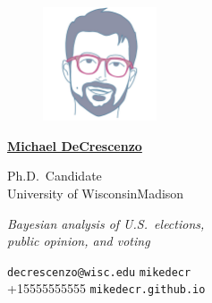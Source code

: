 \documentclass[10pt, oneside, final]{article}
\begin{document}
  \thispagestyle{empty}
  
  \begin{figure}
  \includegraphics[width = 0.3\textwidth]{img/circular-telles.png}
  \end{figure}

  \underline{\large\textsf{\textbf{Michael DeCrescenzo}}}

  {Ph.D.\ Candidate} \\
  {University of Wisconsin{\textendash}Madison}

  \emph{Bayesian analysis of U.S.\ elections, \\ public opinion, and voting}

  \vfill 
  {\faEnvelope} \texttt{decrescenzo@wisc.edu} \hfill 
  {\faGithub} \texttt{mikedecr} \\
  {\faPhone} +1{\textendash}555{\textendash}555{\textendash}5555 \hfill 
  {\faGlobe} \texttt{mikedecr.github.io}
  
\end{document}
